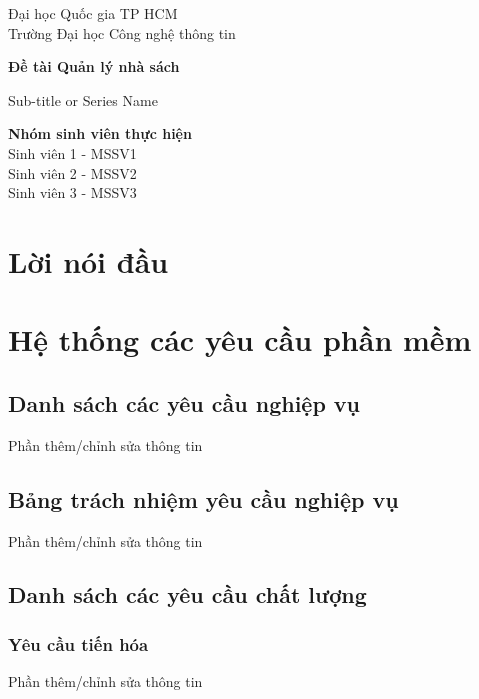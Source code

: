 \documentclass[12pt]{report}
\begin{document}
\begin{titlepage}
    \centering

    \Large
    Đại học Quốc gia TP HCM \\
    Trường Đại học Công nghệ thông tin \\
    \date{2026}
    
    \vspace{0.8cm}
    

    \vfill
    \vspace*{1cm}
    \Huge
    \textbf{Đề tài Quản lý nhà sách}
    
    \vspace{0.5cm}
    \LARGE
    Sub-title or Series Name
    
    \vfill
    \vspace{1.5cm}
    \textbf{Nhóm sinh viên thực hiện} \\
    Sinh viên 1 - MSSV1 \\
    Sinh viên 2 - MSSV2 \\
    Sinh viên 3 - MSSV3 \\

\end{titlepage}

\chapter*{Lời nói đầu}
\pagebreak

\tableofcontents
\pagebreak

\chapter{Hệ thống các yêu cầu phần mềm}
    \section{Danh sách các yêu cầu nghiệp vụ}
        Phần thêm/chỉnh sửa thông tin
    \section{Bảng trách nhiệm yêu cầu nghiệp vụ}
        Phần thêm/chỉnh sửa thông tin
    \section{Danh sách các yêu cầu chất lượng}
        \subsection{Yêu cầu tiến hóa}
            Phần thêm/chỉnh sửa thông tin
\end{document}
